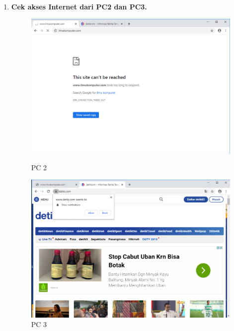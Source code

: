 \documentclass[a4paper,12pt]{article}
\begin{document}
\begin{enumerate}[label=\textbf{\arabic*.}]
    \item \textbf{Cek akses Internet dari PC2 dan PC3.}
        \begin{figure}[]
            \centering
            \includegraphics[width=0.8\linewidth]{image18.png}
            \caption*{PC 2}
            \includegraphics[width=0.8\linewidth]{image19.png}
            \caption*{PC 3}
        \end{figure}

\end{enumerate}
\end{document}
